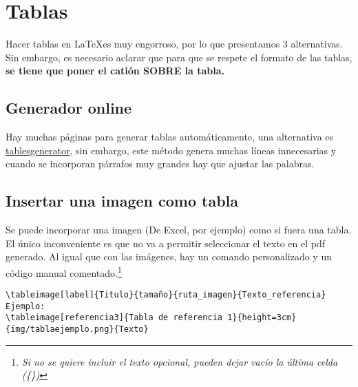 \documentclass[../main.tex]{subfiles}
\begin{document}
\begin{figure}[b]
\end{figure}


\newpage

\section{Tablas}

Hacer tablas en \LaTeX es muy engorroso, por lo que presentamos 3 alternativas. Sin embargo, es necesario aclarar que para que se respete el formato de las tablas, \textbf{se tiene que poner el catión SOBRE la tabla.}

\subsection{Generador online}
Hay muchas páginas para generar tablas automáticamente, una alternativa es \href{https://www.tablesgenerator.com}{tablesgenerator}, sin embargo, este método genera muchas líneas innecesarias y cuando se incorporan párrafos muy grandes hay que ajustar las palabras.

\subsection{Insertar una imagen como tabla}
Se puede incorporar una imagen (De Excel, por ejemplo) como si fuera una tabla. El único inconveniente es que no va a permitir seleccionar el texto en el pdf generado. Al igual que con las imágenes, hay un comando personalizado y un código manual comentado.\footnote{\textit{Si no se quiere incluir el texto opcional, pueden dejar vacío la última celda (\{\})}}
\begin{verbatim} 
\tableimage[label]{Titulo}{tamaño}{ruta_imagen}{Texto_referencia}
Ejemplo:
\tableimage[referencia3]{Tabla de referencia 1}{height=3cm}{img/tablaejemplo.png}{Texto}
\end{verbatim}
\end{document}
